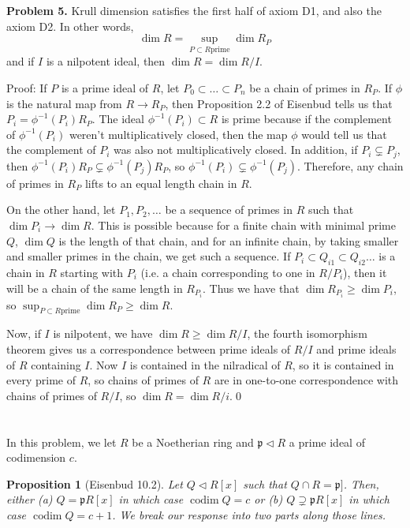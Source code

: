 \documentclass[Letter,12pt]{article}
\newcommand{\problem}[2]{
	\vspace{0.3in}
	\begin{leftbar}
		\noindent \textbf{{#1}.} {#2}
\end{leftbar} }
\renewenvironment{leftbar}{%
	\def\FrameCommand{\vrule width 1pt \relax\hspace {5pt}}
	\MakeFramed {\advance \hsize -\width \FrameRestore }
}{
	\endMakeFramed
}
\newcommand{\pfr}{\mathfrak{p}}
\newcommand{\<}{\left\langle}
\renewcommand{\>}{\right\rangle}
\DeclareMathOperator{\codim}{codim}
\newcommand{\prob}[1]{\setcounter{section}{#1-1}\section{}}
\newtheorem*{prop*}{Proposition}
\theoremstyle{definition}
\begin{document}
	
	\problem{Problem 5}{
		Krull dimension satisfies the first half of axiom D1, and also the axiom D2. In other words, \[\dim R = \sup_{P\subset R \text{prime}} \dim R_P\] and if $I$ is a nilpotent ideal, then $\dim R = \dim R/I$.
	}
	
	Proof: If $P$ is a prime ideal of $R$, let $P_0\subset\ldots\subset P_n$ be a chain of primes in $R_P$. If $\phi$ is the natural map from $R\to R_P$, then Proposition 2.2 of Eisenbud tells us that $P_i = \phi^{-1}(P_i)R_P$. The ideal $\phi^{-1}(P_i)\subset R$ is prime because if the complement of $\phi^{-1}(P_i)$ weren't multiplicatively closed, then the map $\phi$ would tell us that the complement of $P_i$ was also not multiplicatively closed. In addition, if $P_i\subsetneq P_j$, then $\phi^{-1}(P_i)R_P \subsetneq \phi^{-1}(P_j)R_P$, so $\phi^{-1}(P_i)\subsetneq \phi^{-1}(P_j)$. Therefore, any chain of primes in $R_P$ lifts to an equal length chain in $R$.
	
	On the other hand, let $P_1,P_2,\ldots$ be a sequence of primes in $R$ such that $\dim P_i\to\dim R$. This is possible because for a finite chain with minimal prime $Q$, $\dim Q$ is the length of that chain, and for an infinite chain, by taking smaller and smaller primes in the chain, we get such a sequence. If $P_i\subset Q_{i1}\subset Q_{i2}\ldots$ is a chain in $R$ starting with $P_i$ (i.e. a chain corresponding to one in $R/P_i$), then it will be a chain of the same length in $R_{P_i}$. Thus we have that $\dim R_{P_i}\ge \dim P_i$, so $\sup_{P\subset R \text{prime}} \dim R_P\ge \dim R$.
	
	Now, if $I$ is nilpotent, we have $\dim R\ge \dim R/I$, the fourth isomorphism theorem gives us a correspondence between prime ideals of $R/I$ and prime ideals of $R$ containing $I$. Now $I$ is contained in the nilradical of $R$, so it is contained in every prime of $R$, so chains of primes of $R$ are in one-to-one correspondence with chains of primes of $R/I$, so $\dim R = \dim R/i$.\qed
	
	
	
	
	
	\prob{6}	In this problem, we let $R$ be a Noetherian ring and $\pfr\triangleleft R$ a prime ideal of codimension $c$.\begin{prop*}[Eisenbud 10.2]
		Let $Q\triangleleft R[x]$ such that $Q\cap R=\pfr]$. Then, either \emph{(a)} $Q=\pfr R[x]$ in which case $\codim Q= c$ or \emph{(b)} $Q\supsetneq\pfr R[x]$ in which case $\codim Q=c+1$. We break our response into two parts along those lines.
	\end{prop*}
\end{document}
